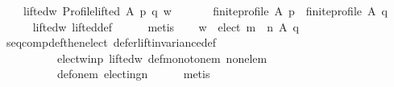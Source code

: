 \begin{isabellebody}
\ \ \ \ lifted{\isacharunderscore}{\kern0pt}w{\isacharcolon}{\kern0pt}\ {\isachardoublequoteopen}Profile{\isachardot}{\kern0pt}lifted\ A\ p\ q\ w{\isachardoublequoteclose}\isanewline
\ \ \isamarkupfalse%
\isanewline
\ \ \ \ {\isachardoublequoteopen}finite{\isacharunderscore}{\kern0pt}profile\ A\ p\ {\isasymand}\ finite{\isacharunderscore}{\kern0pt}profile\ A\ q{\isachardoublequoteclose}\isanewline
\ \ \ \ \isamarkupfalse%
\ lifted{\isacharunderscore}{\kern0pt}w\ lifted{\isacharunderscore}{\kern0pt}def\isanewline
\ \ \ \ \isamarkupfalse%
\ metis\isanewline
\ \ \isamarkupfalse%
\ {\isachardoublequoteopen}w\ {\isasymin}\ elect\ {\isacharparenleft}{\kern0pt}m\ {\isasymtriangleright}\ n{\isacharparenright}{\kern0pt}\ A\ q{\isachardoublequoteclose}\isanewline
\ \ \ \ \isamarkupfalse%
\ seq{\isacharunderscore}{\kern0pt}comp{\isacharunderscore}{\kern0pt}def{\isacharunderscore}{\kern0pt}then{\isacharunderscore}{\kern0pt}elect\ defer{\isacharunderscore}{\kern0pt}lift{\isacharunderscore}{\kern0pt}invariance{\isacharunderscore}{\kern0pt}def\isanewline
\ \ \ \ \ \ \ \ \ \ elect{\isacharunderscore}{\kern0pt}w{\isacharunderscore}{\kern0pt}in{\isacharunderscore}{\kern0pt}p\ lifted{\isacharunderscore}{\kern0pt}w\ def{\isacharunderscore}{\kern0pt}monotone{\isacharunderscore}{\kern0pt}m\ non{\isacharunderscore}{\kern0pt}ele{\isacharunderscore}{\kern0pt}m\isanewline
\ \ \ \ \ \ \ \ \ \ def{\isacharunderscore}{\kern0pt}one{\isacharunderscore}{\kern0pt}m\ electing{\isacharunderscore}{\kern0pt}n\isanewline
\ \ \ \ \isamarkupfalse%
\ metis\isanewline
{}\isamarkupfalse%
%
\endisatagproof
{\isafoldproof}%
%
\isadelimproof
\isanewline
%
\endisadelimproof
%
\isadelimtheory
\isanewline
%
\endisadelimtheory
%
\isatagtheory
{}\isamarkupfalse%
%
\endisatagtheory
{\isafoldtheory}%
%
\isadelimtheory
%
\endisadelimtheory
%
\end{isabellebody}%
\endinput
